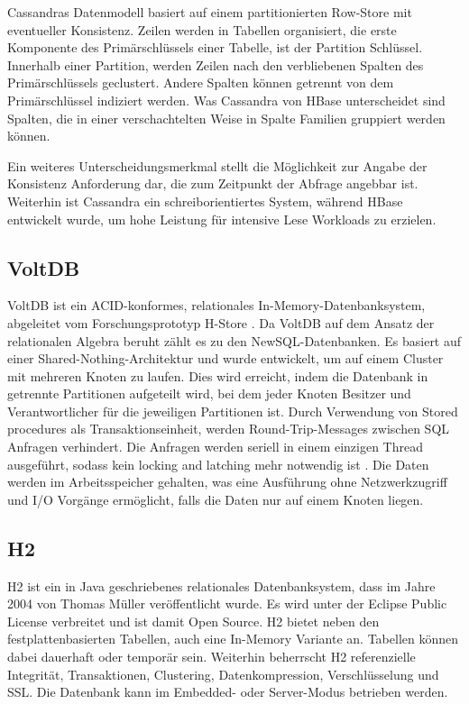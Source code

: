 Cassandras Datenmodell basiert auf einem partitionierten Row-Store mit eventueller Konsistenz. Zeilen werden in Tabellen organisiert, die erste Komponente des Primärschlüssels einer Tabelle, ist der Partition Schlüssel. Innerhalb einer Partition, werden Zeilen nach den verbliebenen Spalten des Primärschlüssels geclustert. Andere Spalten können getrennt von dem Primärschlüssel indiziert werden. Was Cassandra von HBase unterscheidet sind Spalten, die in einer verschachtelten Weise in Spalte Familien gruppiert werden können.

Ein weiteres Unterscheidungsmerkmal stellt die Möglichkeit zur Angabe der Konsistenz Anforderung dar, die zum Zeitpunkt der Abfrage angebbar ist. Weiterhin ist Cassandra ein schreiborientiertes System, während HBase entwickelt wurde, um hohe Leistung für intensive Lese Workloads zu erzielen.

\subsection{VoltDB} 
\label{ch:AnalyseDatenbanken:sec:Datenbanken:subsec:VoltDB}

VoltDB \cite{volt2013a} ist ein ACID-konformes, relationales In-Memory-Datenbanksystem, abgeleitet vom Forschungsprototyp H-Store \cite{kallman08}. Da VoltDB auf dem Ansatz der relationalen Algebra beruht zählt es zu den NewSQL-Datenbanken. Es basiert auf einer Shared-Nothing-Architektur und wurde entwickelt, um auf einem Cluster mit mehreren Knoten zu laufen. Dies wird erreicht, indem die Datenbank in getrennte Partitionen aufgeteilt wird, bei dem jeder Knoten Besitzer und Verantwortlicher für die jeweiligen Partitionen ist. Durch Verwendung von Stored procedures als Transaktionseinheit, werden Round-Trip-Messages zwischen SQL Anfragen verhindert. Die Anfragen werden seriell in einem einzigen Thread ausgeführt, sodass kein locking and latching mehr notwendig ist \cite{volt2013b}. Die Daten werden im Arbeitsspeicher gehalten, was eine Ausführung ohne Netzwerkzugriff und I/O Vorgänge ermöglicht, falls die Daten nur auf einem Knoten liegen.  

\subsection{H2} 
\label{ch:AnalyseDatenbanken:sec:Datenbanken:subsec:H2}

H2 ist ein in Java geschriebenes relationales Datenbanksystem, dass im Jahre 2004 von Thomas Müller veröffentlicht wurde. Es wird unter der Eclipse Public License verbreitet und ist damit Open Source. H2 bietet neben den festplattenbasierten Tabellen, auch eine In-Memory Variante an. Tabellen können dabei dauerhaft oder temporär sein. Weiterhin beherrscht H2 referenzielle Integrität, Transaktionen, Clustering, Datenkompression, Verschlüsselung und SSL. Die Datenbank kann im Embedded- oder Server-Modus betrieben werden.

